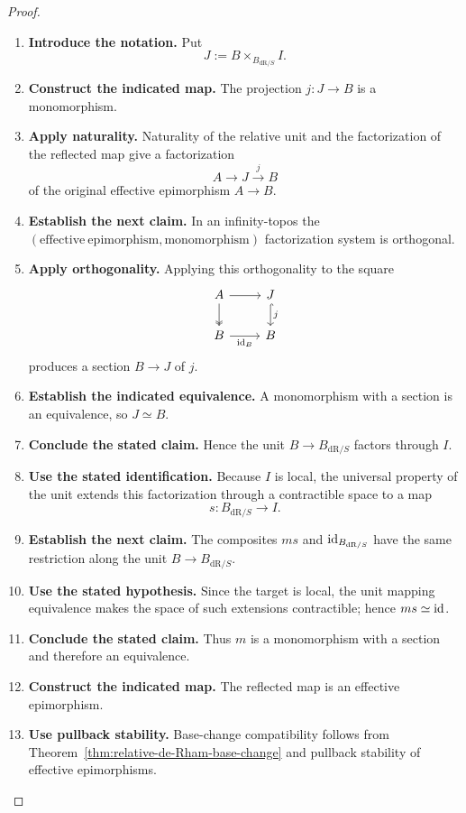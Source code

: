 \begin{proof}
\begin{enumerate}[label=\textup{(\arabic*)}]
    Lemma~\ref{lem:relative-image-locality} makes
    \(I\) local.
    \item \textbf{Introduce the notation.}
    Put
    \[
    J:=B\times_{B_{\mathrm{dR}/S}}I.
    \]
    \item \textbf{Construct the indicated map.}
    The projection \(j:J\to B\) is a monomorphism.
    \item \textbf{Apply naturality.}
    Naturality of the relative unit and the
    factorization of the reflected map give a factorization
    \[
    A\longrightarrow J\xrightarrow{j}B
    \]
    of the original effective epimorphism \(A\to B\).
    \item \textbf{Establish the next claim.}
    In an infinity-topos the
    \((\mathrm{effective\ epimorphism},\mathrm{monomorphism})\) factorization system is orthogonal.
    \item \textbf{Apply orthogonality.}
    Applying this orthogonality to the square
    \[
    \begin{tikzcd}
    A \ar[r] \ar[d,two heads] & J \ar[d,hook,"j"]\\
    B \ar[r,"\id_B"'] & B
    \end{tikzcd}
    \]
    produces a section \(B\to J\) of \(j\).
    \item \textbf{Establish the indicated equivalence.}
    A monomorphism with a section is an
    equivalence, so \(J\simeq B\).
    \item \textbf{Conclude the stated claim.}
    Hence the unit
    \(B\to B_{\mathrm{dR}/S}\) factors through \(I\).
    \item \textbf{Use the stated identification.}
    Because \(I\) is local, the universal property of the unit extends this
    factorization through a contractible space to a map
    \[
    s:B_{\mathrm{dR}/S}\longrightarrow I.
    \]
    \item \textbf{Establish the next claim.}
    The composites \(ms\) and \(\operatorname{id}_{B_{\mathrm{dR}/S}}\) have the same restriction
    along the unit \(B\to B_{\mathrm{dR}/S}\).
    \item \textbf{Use the stated hypothesis.}
    Since the target is local, the unit
    mapping equivalence makes the space of such extensions contractible; hence
    \(ms\simeq\operatorname{id}\).
    \item \textbf{Conclude the stated claim.}
    Thus \(m\) is a monomorphism with a section and therefore an
    equivalence.
    \item \textbf{Construct the indicated map.}
    The reflected map is an effective epimorphism.
    \item \textbf{Use pullback stability.}
    Base-change compatibility
    follows from Theorem~\ref{thm:relative-de-Rham-base-change} and pullback stability
    of effective epimorphisms.
\end{enumerate}
\end{proof}


